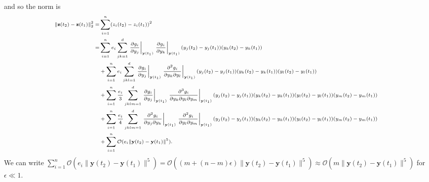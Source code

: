 %
and so the norm is
%
\begin{equation} \label{eq:appendix_z_norm}
\scriptsize
\begin{aligned}
\|\mathbf{z}(t_2) - \mathbf{z}(t_1)\|_2^2 =& 
\sum_{i=1}^n (z_i(t_2) - z_i(t_1))^2 \\
=& \sum_{i=1}^n e_i \sum_{jk=1}^d \left. \frac{\partial g_i}{\partial y_j} \right|_{\mathbf{y}(t_1)} \left. \frac{\partial g_i}{\partial y_k} \right|_{\mathbf{y}(t_1)} (y_j(t_2)-y_j(t_1)) (y_k(t_2)-y_k(t_1)) \\
&+ \sum_{i=1}^n e_i \sum_{jkl=1}^d \left. \frac{\partial g_i}{\partial y_j} \right|_{\mathbf{y}(t_1)} \left. \frac{\partial^2 g_i}{\partial y_k \partial y_l} \right|_{\mathbf{y}(t_1)} (y_j(t_2)-y_j(t_1))  (y_k(t_2)-y_k(t_1)) (y_l(t_2)-y_l(t_1)) \\
&+ \sum_{i=1}^n \frac{e_i}{3} \sum_{jklm=1}^d \left. \frac{\partial g_i}{\partial y_j} \right|_{\mathbf{y}(t_1)} \left. \frac{\partial^3 g_i}{ \partial y_k \partial y_l \partial y_m} \right|_{\mathbf{y}(t_1)} (y_j(t_2)-y_j(t_1)) (y_k(t_2)-y_k(t_1)) (y_l(t_2)-y_l(t_1))(y_m(t_2)-y_m(t_1)) \\
&+ \sum_{i=1}^n \frac{e_i}{4} \sum_{jklm=1}^d \left. \frac{\partial^2 g_i}{\partial y_j \partial y_k} \right|_{\mathbf{y}(t_1)} \left. \frac{\partial^2 g_i}{\partial y_l \partial y_m} \right|_{\mathbf{y}(t_1)} (y_j(t_2)-y_j(t_1)) (y_k(t_2)-y_k(t_1)) (y_l(t_2)-y_l(t_1)) (y_m(t_2)-y_m(t_1)) \\
&+ \sum_{i=1}^n \mathcal{O}( e_i \|\mathbf{y}(t_2) - \mathbf{y}(t_1) \|^5) .
\end{aligned}
\end{equation}
%
We can write $\sum_{i=1}^n \mathcal{O}( e_i \|\mathbf{y}(t_2) - \mathbf{y}(t_1) \|^5) = \mathcal{O}( (m + (n-m) \epsilon) \|\mathbf{y}(t_2) - \mathbf{y}(t_1) \|^5) \approx \mathcal{O}( m \|\mathbf{y}(t_2) - \mathbf{y}(t_1) \|^5)$ for $\epsilon \ll 1$. 

